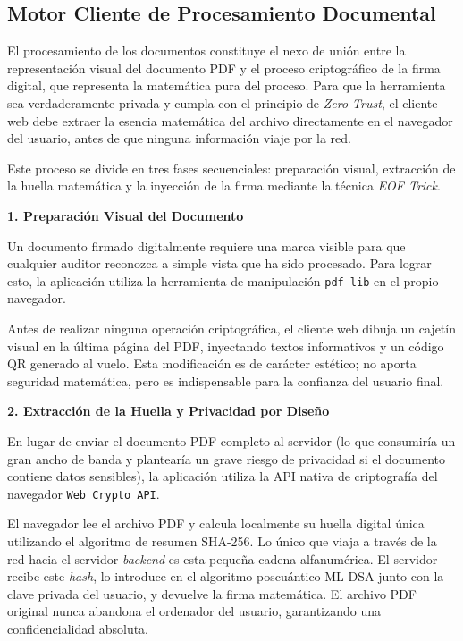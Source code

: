 \documentclass[11pt, a4paper]{report}
\theoremstyle{definition}
\begin{document}
\subsection{Motor Cliente de Procesamiento Documental}
\label{subsec:motor_cliente_procesamiento}

El procesamiento de los documentos constituye el nexo de unión entre la representación visual del documento PDF y el proceso criptográfico de la firma digital, que representa la matemática pura del proceso. Para que la herramienta sea verdaderamente privada y cumpla con el principio de \textit{Zero-Trust}, el cliente web debe extraer la esencia matemática del archivo directamente en el navegador del usuario, antes de que ninguna información viaje por la red.

Este proceso se divide en tres fases secuenciales: preparación visual, extracción de la huella matemática y la inyección de la firma mediante la técnica \textit{EOF Trick}.\vspace{0.3cm}

\textbf{1. Preparación Visual del Documento}\vspace{0.3cm}

Un documento firmado digitalmente requiere una marca visible para que cualquier auditor reconozca a simple vista que ha sido procesado. Para lograr esto, la aplicación utiliza la herramienta de manipulación \texttt{pdf-lib} en el propio navegador. 

Antes de realizar ninguna operación criptográfica, el cliente web dibuja un cajetín visual en la última página del PDF, inyectando textos informativos y un código QR generado al vuelo. Esta modificación es de carácter estético; no aporta seguridad matemática, pero es indispensable para la confianza del usuario final.\vspace{0.3cm}

\textbf{2. Extracción de la Huella y Privacidad por Diseño}\vspace{0.3cm}

En lugar de enviar el documento PDF completo al servidor (lo que consumiría un gran ancho de banda y plantearía un grave riesgo de privacidad si el documento contiene datos sensibles), la aplicación utiliza la API nativa de criptografía del navegador \texttt{Web Crypto API}.

El navegador lee el archivo PDF y calcula localmente su huella digital única utilizando el algoritmo de resumen SHA-256. Lo único que viaja a través de la red hacia el servidor \textit{backend} es esta pequeña cadena alfanumérica. El servidor recibe este \textit{hash}, lo introduce en el algoritmo poscuántico ML-DSA junto con la clave privada del usuario, y devuelve la firma matemática. El archivo PDF original nunca abandona el ordenador del usuario, garantizando una confidencialidad absoluta.\vspace{0.3cm}
\end{document}
